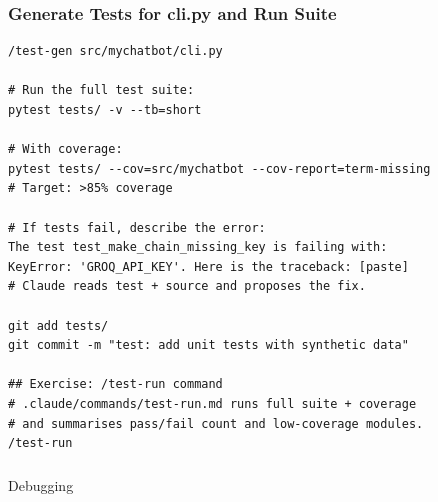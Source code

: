 \begin{frame}[fragile]\frametitle{Generate Tests for cli.py and Run Suite}


\begin{lstlisting}
/test-gen src/mychatbot/cli.py

# Run the full test suite:
pytest tests/ -v --tb=short

# With coverage:
pytest tests/ --cov=src/mychatbot --cov-report=term-missing
# Target: >85% coverage

# If tests fail, describe the error:
The test test_make_chain_missing_key is failing with:
KeyError: 'GROQ_API_KEY'. Here is the traceback: [paste]
# Claude reads test + source and proposes the fix.

git add tests/
git commit -m "test: add unit tests with synthetic data"

## Exercise: /test-run command
# .claude/commands/test-run.md runs full suite + coverage
# and summarises pass/fail count and low-coverage modules.
/test-run
\end{lstlisting}
\end{frame}


\begin{frame}[fragile]\frametitle{}
\begin{center}
{\Large Debugging}

\end{center}
\end{frame}


